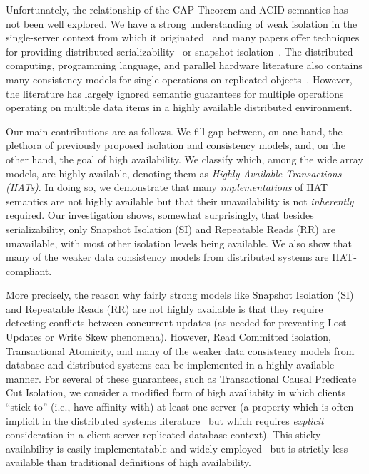 Unfortunately, the relationship of the CAP Theorem and ACID semantics
has not been well explored. We have a strong understanding of weak
isolation in the single-server context from which it
originated~\cite{adya, ansicritique, gray-isolation} and many papers
offer techniques for providing distributed
serializability~\cite{bernstein-concurrency, spanner, granola,
  daudjee-session, krikellas-bargain, calvin} or snapshot
isolation~\cite{daudjee-snapshot,generalizedsnapshot, kemme-snapshot,
  walter}. The distributed computing, programming language, and
parallel hardware literature also contains many consistency models for
single operations on replicated objects~\cite{pnuts, herlihy-art,
  cops, eiger, cac, sessionguarantees}. However, the literature has
largely ignored semantic guarantees for multiple operations operating
on multiple data items in a highly available distributed environment.

Our main contributions are as follows. We fill gap between, on one
hand, the plethora of previously proposed isolation and consistency
models, and, on the other hand, the goal of high availability.  We
classify which, among the wide array models, are highly available,
denoting them as {\em Highly Available Transactions (HATs)}. In doing
so, we demonstrate that many \textit{implementations} of HAT semantics
are not highly available but that their unavailability is not
\textit{inherently} required. Our investigation shows, somewhat
surprisingly, that besides serializability, only Snapshot Isolation
(SI) and Repeatable Reads (RR) are unavailable, with most other
isolation levels being available. We also show that many of the weaker
data consistency models from distributed systems are HAT-compliant.

More precisely, the reason why fairly strong models like Snapshot
Isolation (SI) and Repeatable Reads (RR) are not highly available is
that they require detecting conflicts between concurrent updates (as
needed for preventing Lost Updates or Write Skew phenomena). However,
Read Committed isolation, Transactional Atomicity, and many of the
weaker data consistency models from database and distributed systems
can be implemented in a highly available manner. For several of these
guarantees, such as Transactional Causal Predicate Cut Isolation, we
consider a modified form of high availiabity in which clients ``stick
to'' (i.e., have affinity with) at least one server (a property which
is often implicit in the distributed systems
literature~\cite{herlihy-art, cops, eiger, cac} but which requires
\textit{explicit} consideration in a client-server replicated database
context). This sticky availability is easily implementatable and
widely employed~\cite{cops, eiger, vogels-defs} but is strictly less
available than traditional definitions of high availability.


